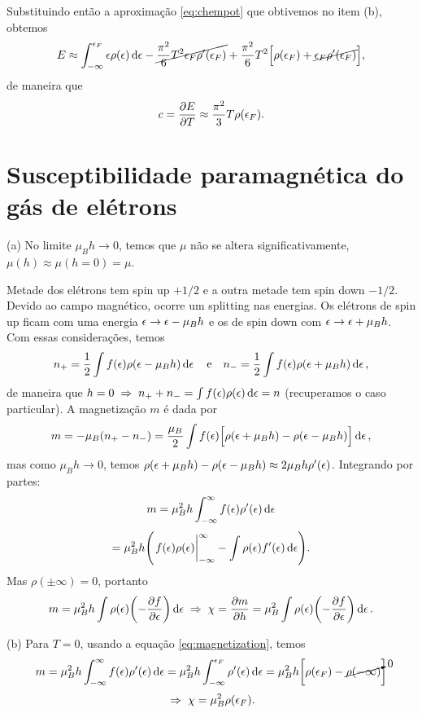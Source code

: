 \documentclass[a4paper,10pt]{article}
\begin{document}
\n

Substituindo então a aproximação \ref{eq:chempot} que obtivemos no item (b), obtemos
$$
E \approx \int_{-\infty}^{\epsilon_F} \epsilon \rho(\epsilon) \dd{\epsilon}
- \cancel{ \frac{\pi^2}{6} T^2 \epsilon_F \rho'(\epsilon_F) } +
\frac{\pi^2}{6} T^2 \Big[\rho(\epsilon_F) + \cancel{ \epsilon_F \rho'(\epsilon_F) } \Big],
$$
de maneira que
$$
c = \pdv{E}{T} \approx \frac{\pi^2}{3} T \rho(\epsilon_F).
$$


\pagebreak

\section{Susceptibilidade paramagnética do gás de elétrons}

(a) No limite $\mu_B h \to 0$, temos que $\mu$ não se altera significativamente, $\mu(h) \approx \mu(h = 0) = \mu$.

Metade dos elétrons tem spin up $+1/2$ e a outra metade tem spin down $-1/2$. Devido ao campo magnético, ocorre um splitting nas energias. Os elétrons de spin up ficam com uma energia $\epsilon \to \epsilon - \mu_B h$ e os de spin down com $\epsilon \to \epsilon + \mu_B h$. Com essas considerações, temos
$$
n_+ = \frac{1}{2} \int f(\epsilon) \rho(\epsilon - \mu_B h) \dd{\epsilon} \quad \mathrm{e} \quad
n_- = \frac{1}{2} \int f(\epsilon) \rho(\epsilon + \mu_B h) \dd{\epsilon},
$$
de maneira que $h = 0 \; \Rightarrow \; n_+ + n_- = \int f(\epsilon) \rho(\epsilon) \dd{\epsilon} = n$ (recuperamos o caso particular). A magnetização $m$ é dada por
$$
m = - \mu_B (n_+ - n_-) =
\frac{\mu_B}{2} \int f(\epsilon) \Big[ \rho(\epsilon + \mu_B h) - \rho(\epsilon - \mu_B h) \Big] \dd{\epsilon},
$$
mas como $\mu_B h \to 0$, temos $\rho(\epsilon + \mu_B h) - \rho(\epsilon - \mu_B h) \approx 2 \mu_B h \rho'(\epsilon)$. Integrando por partes:
\begin{equation} \label{eq:magnetization}
m = \mu_B^2 h \int_{-\infty}^{\infty} f(\epsilon) \rho'(\epsilon) \dd{\epsilon}
\end{equation}
$$
= \mu_B^2 h \qty(\eval{f(\eps) \rho(\eps)}_{-\infty}^{\infty} - \int \rho(\eps) f'(\eps) \dd{\eps} ).
$$
Mas $\rho(\pm\infty) = 0$, portanto
$$
m = \mu_B^2 h \int \rho(\epsilon) \qty(- \pdv{f}{\epsilon}) \dd{\epsilon} \; \Rightarrow \;
\chi = \pdv{m}{h} = \mu_B^2 \int \rho(\epsilon) \qty(- \pdv{f}{\epsilon}) \dd{\epsilon}.
$$

(b) Para $T = 0$, usando a equação \ref{eq:magnetization}, temos
$$
m = \mu_B^2 h \int_{-\infty}^{\infty} f(\epsilon) \rho'(\epsilon) \dd{\epsilon} =
\mu_B^2 h \int_{-\infty}^{\epsilon_F} \rho'(\epsilon) \dd{\epsilon} =
\mu_B^2 h \qty[ \rho(\epsilon_F) - \cancelto{0}{\rho(-\infty)} ]
$$
$$
\; \Rightarrow \; \chi = \mu_B^2 \rho(\epsilon_F).
$$
\end{document}

